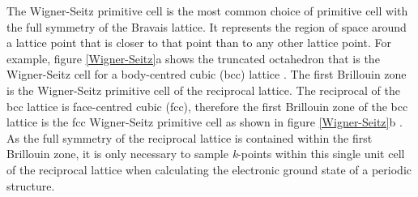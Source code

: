 \documentclass[11pt, twoside]{report}
\begin{document}
The Wigner-Seitz primitive cell is the most common choice of primitive cell with the full symmetry of the Bravais lattice. It represents the region of space around a lattice point  that is closer to that point than to any other lattice point. For example, figure \ref{Wigner-Seitz}a shows the truncated octahedron that is the Wigner-Seitz cell for a body-centred cubic (bcc) lattice \cite{AshcroftMermin2}.
The first Brillouin zone is the Wigner-Seitz primitive cell of the reciprocal lattice. The reciprocal of the bcc lattice is face-centred cubic (fcc), therefore the first Brillouin zone of the bcc lattice is the fcc Wigner-Seitz primitive cell as shown in figure \ref{Wigner-Seitz}b \cite{AshcroftMermin3}. As the full symmetry of the reciprocal lattice is contained within the first Brillouin zone, it is only necessary to sample \textit{k}-points within this single unit cell of the reciprocal lattice when calculating the electronic ground state of a periodic structure.
\end{document}
